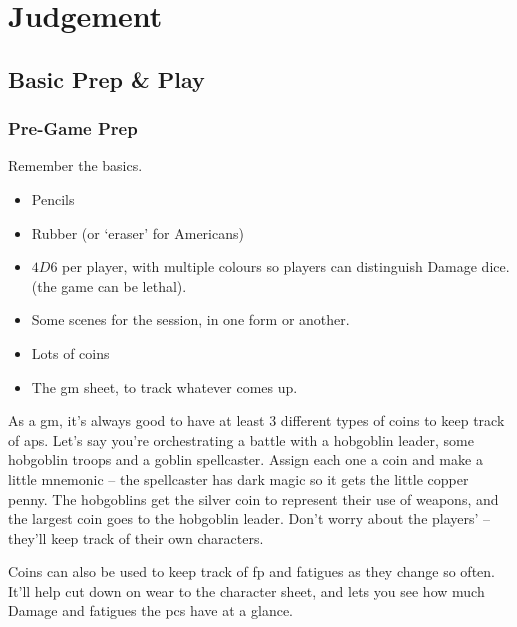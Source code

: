 \chapter[Bastion of Judgement]{Judgement}
\label{judgement}

\section{Basic Prep \& Play}

\begin{multicols}{2}

\subsection{Pre-Game Prep}

Remember the basics.

\begin{itemize}
  \item
  Pencils
  \item
  Rubber (or `eraser' for Americans)
  \item
  $4D6$ per player, with multiple colours so players can distinguish Damage dice.
  \iftoggle{stories}{
    \item
    A boat-load of character sheets
  }{
    Some pre-made characters, including spares
  } (the game can be lethal).
  \item
  Some scenes for the session, in one form or another.
  \item
  Lots of coins
  \item
  The \gls{gm} sheet, to track whatever comes up.
\end{itemize}

As a \gls{gm}, it's always good to have at least 3 different types of coins to keep track of \glspl{ap}.
Let's say you're orchestrating a battle with a hobgoblin leader, some hobgoblin troops and a goblin spellcaster.
Assign each one a coin and make a little mnemonic -- the spellcaster has dark magic so it gets the little copper penny.
The hobgoblins get the silver coin to represent their use of weapons, and the largest coin goes to the hobgoblin leader.
Don't worry about the players'  -- they'll keep track of their own characters.

Coins can also be used to keep track of \gls{fp} and \glspl{fatigue} as they change so often.
It'll help cut down on wear to the character sheet, and lets you see how much Damage and \glspl{fatigue} the \glspl{pc} have at a glance.


\end{multicols}
